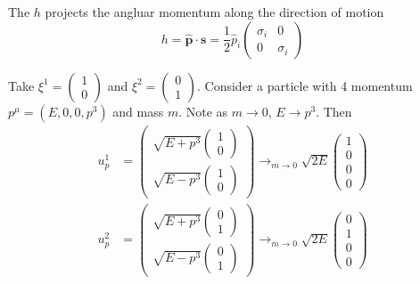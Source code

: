 \documentclass{article}
\begin{document}
\begin{definition}
The  $h$ projects the angluar momentum along the direction of motion 
\[
h=\hat{\bm{p}} \cdot \bm{s} = \frac{1}{2}\hat{p}_i \begin{pmatrix} \sigma_i & 0 \\ 0 & \sigma_i \end{pmatrix}
\]
\end{definition}

\begin{example}
Take $\xi^1=\begin{pmatrix} 1 \\ 0 \end{pmatrix}$ and $\xi^2=\begin{pmatrix} 0 \\ 1 \end{pmatrix}$. Consider a particle with 4 momentum $p^\mu = (E,0,0,p^3)$ and mass $m$. Note as $m \to 0$, $E \to p^3$. Then 
\begin{align*}
    u_p^1 &= \begin{pmatrix} \sqrt{E+p^3} \begin{pmatrix} 1 \\ 0 \end{pmatrix} \\ \sqrt{E-p^3} \begin{pmatrix} 1 \\ 0 \end{pmatrix} \end{pmatrix} \to_{m \to 0} \sqrt{2E}\begin{pmatrix} 1 \\ 0 \\ 0 \\ 0 \end{pmatrix} \\
    u_p^2 &= \begin{pmatrix} \sqrt{E+p^3} \begin{pmatrix} 0 \\ 1 \end{pmatrix} \\ \sqrt{E-p^3} \begin{pmatrix} 0 \\ 1 \end{pmatrix} \end{pmatrix} \to_{m \to 0} \sqrt{2E}\begin{pmatrix} 0 \\ 1 \\ 0 \\ 0 \end{pmatrix} \\
\end{align*}


\end{example}
\end{document}
